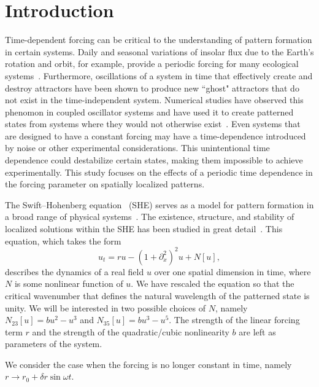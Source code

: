 \documentclass[../main/TimeForcingSHE.tex]{subfiles}
\begin{document}
\section{Introduction}

Time-dependent forcing can be critical to the understanding of pattern formation in certain systems.  Daily and seasonal variations of insolar flux due to the Earth's rotation and orbit, for example, provide a periodic forcing for many ecological systems~\cite{}.   Furthermore, oscillations of a system in time that effectively create and destroy attractors have been shown to produce new ``ghost" attractors that do not exist in the time-independent system.  Numerical studies  have observed this phenomon in coupled oscillator systems\cite{} and have used it to create patterned states from systems where they would not otherwise exist~\cite{}.   Even systems that are designed to have a constant forcing may have a time-dependence introduced by noise or other experimental considerations.  This unintentional time dependence could destabilize certain states, making them impossible to achieve experimentally.   This study focuses on the effects of a periodic time dependence in the forcing parameter on spatially localized patterns.     

The Swift--Hohenberg equation~\cite{swift1977} (SHE) serves as a model for pattern formation in a broad range of physical systems~\cite{}.  The existence, structure, and stability of localized solutions within the SHE has been studied in great detail~\cite{burke2006,burke2007snakes,burke2007stability}.   This equation, which takes the form  
\begin{equation}
u_t= r u-\left(1+\partial_{x}^2\right)^2u+N[u]\label{eq:SH},
\end{equation}
describes the dynamics of a real field $u$ over one spatial dimension in time, where $N$ is some nonlinear function of $u$.  We have rescaled the equation so that the critical wavenumber that defines the natural wavelength of the patterned state is unity.  We will be interested in two possible choices of $N$, namely $N_{23}[u]=bu^2-u^3$ and $N_{35}[u]=b u^3-u^5$.  The strength of the linear forcing term $r$ and the strength of the quadratic/cubic nonlinearity $b$ are left as parameters of the system.  

We consider the case when the forcing is no longer constant in time, namely $r\rightarrow r_0+\delta r \sin\omega t$. 


\end{document}

